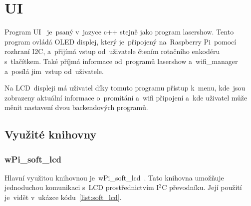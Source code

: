 \section{UI}
Program UI ~je~psaný v~jazyce c++ stejně jako program lasershow. Tento program ovládá OLED displej, který je~připojený na~Raspberry Pi~pomocí rozhraní I2C, a~přijímá vstup od~uživatele čtením rotačního enkodéru s~tlačítkem. Také příjmá informace od~programů lasershow  a~wifi\_manager  a~posílá  jim~vstup od~uživatele.

Na  LCD~displeji má uživatel díky tomuto programu přístup  k~menu,  kde~jsou zobrazeny aktuální informace  o~promítání  a~wifi připojení  a~kde uživatel může měnit nastavení dvou backendových programů.


\subsection{Využité knihovny}
\subsubsection{wPi\_soft\_lcd}
Hlavní využitou knihovnou je~wPi\_soft\_lcd~\cite{wpi-lcd}. Tato knihovna umožňuje jednoduchou komunikaci  s~LCD prostřednictvím I$^{2}$C převodníku. Její použití  je~vidět  v~ukázce kódu~\ref{list:soft_lcd}.

\begin{code}
    \inputminted[frame=lines,fontsize=\footnotesize{}, linenos, breaklines]{cpp}{code_examples/soft_lcd.cpp}
\end{code}

